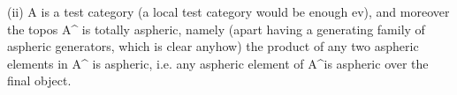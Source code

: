 (ii)  A is a test category (a local test category would be enough
ev),  and moreover the topos A\^{} is totally aspheric\inserted{[Section 35]}, namely
(apart having a generating family of aspheric generators,  which
is clear anyhow)  the product of any two aspheric elements in A\^{}
is aspheric,  i.e. any aspheric element of A\^{}\hand{/}is aspheric over the
final object.
